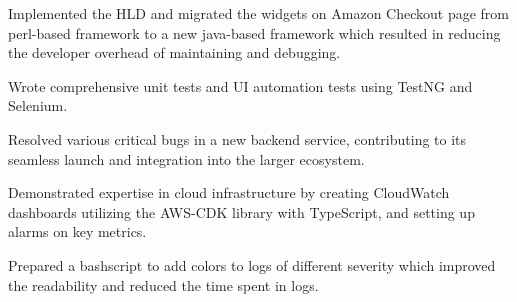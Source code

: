 \documentclass[10pt]{article}
\begin{document}
\begin{description}
\setlength{\itemindent}{2\parindent}
\item[$\bullet$]{Implemented the HLD and migrated the widgets on Amazon Checkout page from perl-based framework to a new java-based framework which resulted in reducing the developer overhead of maintaining and debugging.}
\item[$\bullet$]{Wrote comprehensive unit tests and UI automation tests using TestNG and Selenium.}
\item[$\bullet$]{Resolved various critical bugs in a new backend service, contributing to its seamless launch and integration into the larger ecosystem.}
\item[$\bullet$]{Demonstrated expertise in cloud infrastructure by creating CloudWatch dashboards utilizing the AWS-CDK library with TypeScript, and setting up alarms on key metrics.}
\item[$\bullet$]{Prepared a bashscript to add colors to logs of different severity which improved the readability and reduced the time spent in logs.}
\end{description}



\end{document}
